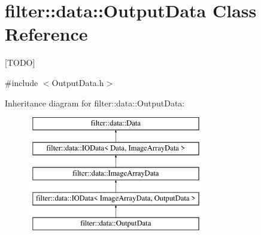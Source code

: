 \hypertarget{classfilter_1_1data_1_1_output_data}{}\section{filter\+:\+:data\+:\+:Output\+Data Class Reference}
\label{classfilter_1_1data_1_1_output_data}


\mbox{[}T\+O\+DO\mbox{]}  




{\ttfamily \#include $<$Output\+Data.\+h$>$}

Inheritance diagram for filter\+:\+:data\+:\+:Output\+Data\+:\begin{figure}[H]
\begin{center}
\leavevmode
\includegraphics[height=5.000000cm]{d6/de9/classfilter_1_1data_1_1_output_data}
\end{center}
\end{figure}

